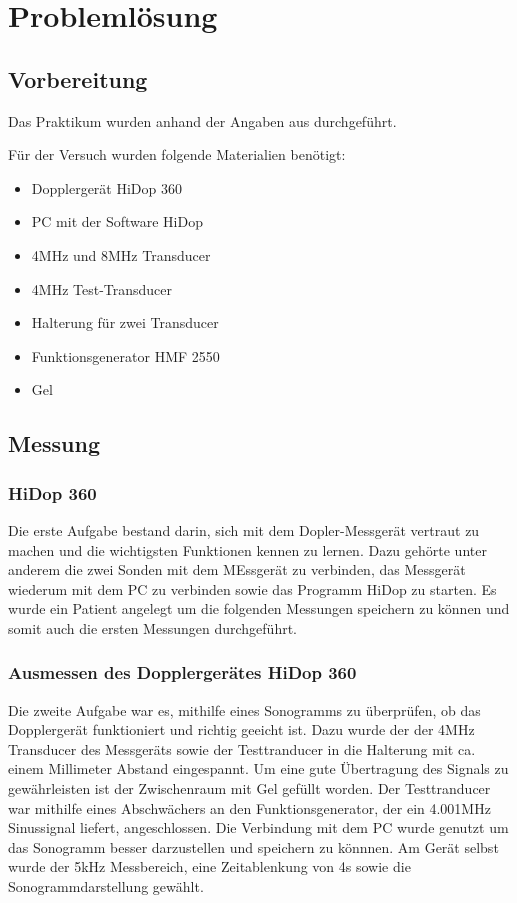 \documentclass[11pt]{scrartcl}
\begin{document}
    \section{Problemlösung}
    \subsection{Vorbereitung}
   Das Praktikum wurden anhand der Angaben aus \cite{Doppler} durchgeführt.
    
    Für der Versuch wurden folgende Materialien benötigt:
    \begin{itemize}
        \item Dopplergerät HiDop 360 
        \item PC mit der Software HiDop
        \item 4MHz und 8MHz Transducer
        \item 4MHz Test-Transducer 
        \item Halterung für zwei Transducer
        \item Funktionsgenerator HMF 2550 
        \item Gel
    \end{itemize}


    \subsection{Messung}
    \subsubsection{HiDop 360}
    Die erste Aufgabe bestand darin, sich mit dem Dopler-Messgerät vertraut zu machen 
    und die wichtigsten Funktionen kennen zu lernen.
    Dazu gehörte unter anderem die zwei Sonden mit dem MEssgerät zu verbinden, das Messgerät 
    wiederum mit dem PC zu verbinden sowie das Programm HiDop zu starten.
    Es wurde ein Patient angelegt um die folgenden Messungen speichern zu können und somit auch die ersten Messungen durchgeführt. 

    \subsubsection{Ausmessen des Dopplergerätes HiDop 360}
    Die zweite Aufgabe war es, mithilfe eines Sonogramms zu überprüfen, ob das Dopplergerät funktioniert und richtig geeicht ist. 
    Dazu wurde der der 4MHz Transducer des Messgeräts sowie der Testtranducer in die Halterung mit ca. einem Millimeter Abstand eingespannt.
    Um eine gute Übertragung des Signals zu gewährleisten ist der Zwischenraum mit Gel gefüllt worden. 
    Der Testtranducer war mithilfe eines Abschwächers an den Funktionsgenerator, der ein 4.001MHz Sinussignal liefert, angeschlossen. 
    Die Verbindung mit dem PC wurde genutzt um das Sonogramm besser darzustellen und speichern zu könnnen.
    Am Gerät selbst wurde der 5kHz Messbereich, eine Zeitablenkung von 4s sowie die Sonogrammdarstellung gewählt.
\end{document}
